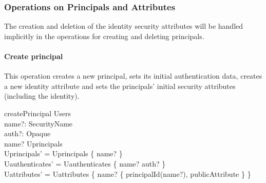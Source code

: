 \subsubsection{Operations on Principals and Attributes}

The creation and deletion of the identity security attributes will be handled
implicitly in the operations for creating and deleting principals.

\paragraph{Create principal} 
This operation creates a new principal, sets its initial authentication data,
creates a new identity attribute and sets the principals' initial security
attributes (including the identity).
\begin{schema}{createPrincipal}
  \Delta Users \\
  name?: SecurityName \\
  auth?: Opaque \\
  \where
  name? \notin Uprincipals \\
  Uprincipals' = Uprincipals \cup \{ name? \} \\
  Uauthenticates' = Uauthenticates \cup \{ name? \mapsto auth? \} \\
  Uattributes' = Uattributes \oplus \{ name? \mapsto \{ principalId(name?),
  publicAttribute \} \} \\
\end{schema}



